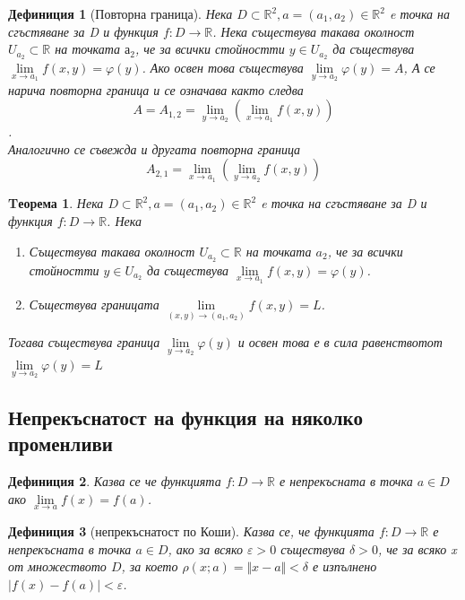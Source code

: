 \documentclass[a4paper,fleqn,12pt]{article}
\newtheorem{theorem}{Tеорема}[subsection]
\newtheorem{definition}{Дефиниция}[subsection]
\theoremstyle{definition}
\begin{document}
\begin{definition}[Повторна граница]
Нека $D \subset \mathbb{R}^2, a = (a_1, a_2) \in \mathbb{R}^2$ e точка на сгъстяване за D и функция $f: D\to \mathbb{R}$. Нека съществува такава околност $U_{a_2} \subset \mathbb{R}$ на точката $а_2$, че за всички стойностти $y \in U_{a_2} $ да съществува  $\lim\limits_{x \to a_1} f(x,y) = \varphi (y)$. Ако освен това съществува $\lim\limits_{y \to a_2} \varphi (y) = A$, А се нарича повторна граница и се означава както следва 
$$A = A_{1,2} =\lim\limits_{y \to a_2} (\lim\limits_{x \to a_1} f(x,y) ) $$.\\
Аналогично се съвежда и другата повторна граница 
$$ A_{2,1} = \lim\limits_{x \to a_1} (\lim\limits_{y \to a_2} f(x,y) ) $$
\end{definition}

\begin{theorem}
Нека $D \subset \mathbb{R}^2, a = (a_1, a_2) \in \mathbb{R}^2$ e точка на сгъстяване за D и функция $f: D \to \mathbb{R}$.  Нека
\begin{enumerate}
		\item  Съществува такава околност $U_{a_2} \subset \mathbb{R}$ на точката $a_2$, че за всички стойностти $y \in U_{a_2} $ да съществува  $\lim\limits_{x \to a_1} f(x,y) = \varphi (y)$.

		\item Съществува границата $\lim\limits_{(x, y) \to (a_1,a_2) } f(x,y) = L$.
\end{enumerate}
Тогава съществува граница  $\lim\limits_{y \to a_2} \varphi (y)$ и освен това е в сила равенствотот  $\lim\limits_{y \to a_2} \varphi (y) = L$
\end{theorem}

\subsection{Непрекъснатост на функция на няколко променливи}

\begin{definition}
Казва се че функцията $f: D \to \mathbb{R}$ е непрекъсната в точка $a \in D$ ако $\lim\limits_{x \to a} f(x) = f(a)$.
\end{definition}

\begin{definition}[непрекъснатост по Коши]
Казва се, че функцията $f: D \to \mathbb{R}$ е непрекъсната в точка $a \in D$, ако за всяко $\varepsilon > 0$ съществува $\delta > 0$, че за всяко x от множеството $D $, за което $\rho(x;a) = \Vert x - a \Vert < \delta $ е изпълнено $\vert f(x) - f(a) \vert  < \varepsilon$.
\end{definition}
\end{document}
